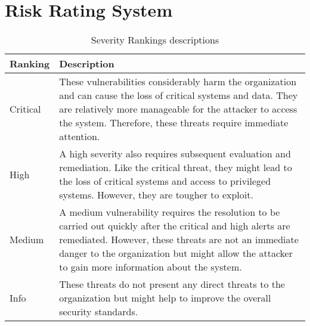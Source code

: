 \chapter{Risk Rating System}
\begin{comment}
The Common Vulnerability Scoring System v3.0 (CVSS) is taken as a baseline for the assessment to characterize and measure some of the vulnerability's potential impact on the CMS system \citep[p.~516]{cvss}. 
The rating is not solely based on these metrics due to the limiting factor that CVSS does not entirely reflect the actual risk in the organization \citep[p.~7]{limitations_cvss}. However, since CVSS has been adopted widely and used by many enterprises, i.e., National Vulnerability Database \citep{nist}, it is chosen to be included in the analysis. The rankings are further determined based on CVSS, the probability of an attack, and the impact on the system.
The rankings for vulnerabilities are assigned based on the score, which is as follows:
\end{comment}

\begingroup
\centering
\setlength{\tabcolsep}{6.5pt} %
\renewcommand{\arraystretch}{1.8} %
\begin{longtable}{ |p{5cm}| p{10cm} |}
\caption{Severity Rankings descriptions}
    \label{table:spoofing}
\hline
\rowcolor{grey!15}
\textbf{Ranking}  & \textbf{Description}\\
\hline
\cellcolor{red!95} Critical  & These vulnerabilities considerably harm the organization and can cause the loss of critical systems and data. They are relatively more manageable for the attacker to access the system. Therefore, these threats require immediate attention.\\
\hline
\cellcolor{red!70} High  &  A high severity also requires subsequent evaluation and remediation. Like the critical threat, they might lead to the loss of critical systems and access to privileged systems. However, they are tougher to exploit.\\
\hline
\hline
\cellcolor{yellow!95} Medium &  A medium vulnerability requires the resolution to be carried out quickly after the critical and high alerts are remediated. However, these threats are not an immediate danger to the organization but might allow the attacker to gain more information about the system.\\
\hline
\cellcolor{grey!55} Info  &  These threats do not present any direct threats to the organization but might help to improve the overall security standards.\\
\hline
\end{longtable}
\endgroup